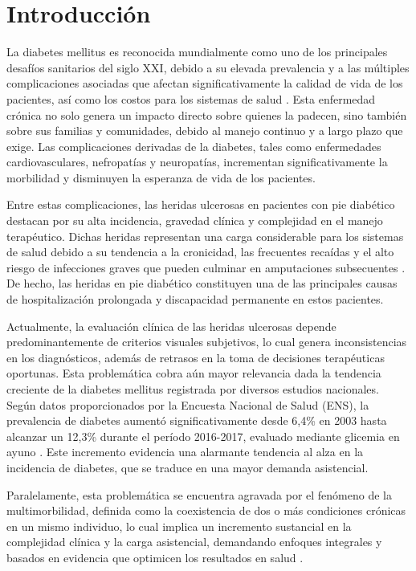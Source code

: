 
\section{Introducción}
\label{sec:Intr}
La diabetes mellitus es reconocida mundialmente como uno de los principales desafíos sanitarios del siglo XXI, debido a su elevada prevalencia y a las múltiples complicaciones asociadas que afectan significativamente la calidad de vida de los pacientes, así como los costos para los sistemas de salud \cite{ministerio2022estrategia}. Esta enfermedad crónica no solo genera un impacto directo sobre quienes la padecen, sino también sobre sus familias y comunidades, debido al manejo continuo y a largo plazo que exige. Las complicaciones derivadas de la diabetes, tales como enfermedades cardiovasculares, nefropatías y neuropatías, incrementan significativamente la morbilidad y disminuyen la esperanza de vida de los pacientes.

Entre estas complicaciones, las heridas ulcerosas en pacientes con pie diabético destacan por su alta incidencia, gravedad clínica y complejidad en el manejo terapéutico. Dichas heridas representan una carga considerable para los sistemas de salud debido a su tendencia a la cronicidad, las frecuentes recaídas y el alto riesgo de infecciones graves que pueden culminar en amputaciones subsecuentes \cite{mishra2017diabetic,bandyk2018diabetic}. De hecho, las heridas en pie diabético constituyen una de las principales causas de hospitalización prolongada y discapacidad permanente en estos pacientes.

Actualmente, la evaluación clínica de las heridas ulcerosas depende predominantemente de criterios visuales subjetivos, lo cual genera inconsistencias en los diagnósticos, además de retrasos en la toma de decisiones terapéuticas oportunas. Esta problemática cobra aún mayor relevancia dada la tendencia creciente de la diabetes mellitus registrada por diversos estudios nacionales. Según datos proporcionados por la Encuesta Nacional de Salud (ENS), la prevalencia de diabetes aumentó significativamente desde 6,4\% en 2003 hasta alcanzar un 12,3\% durante el período 2016-2017, evaluado mediante glicemia en ayuno \cite{troncoso2020estilos}. Este incremento evidencia una alarmante tendencia al alza en la incidencia de diabetes, que se traduce en una mayor demanda asistencial.

Paralelamente, esta problemática se encuentra agravada por el fenómeno de la multimorbilidad, definida como la coexistencia de dos o más condiciones crónicas en un mismo individuo, lo cual implica un incremento sustancial en la complejidad clínica y la carga asistencial, demandando enfoques integrales y basados en evidencia que optimicen los resultados en salud \cite{sarmiento2022patrones}.

